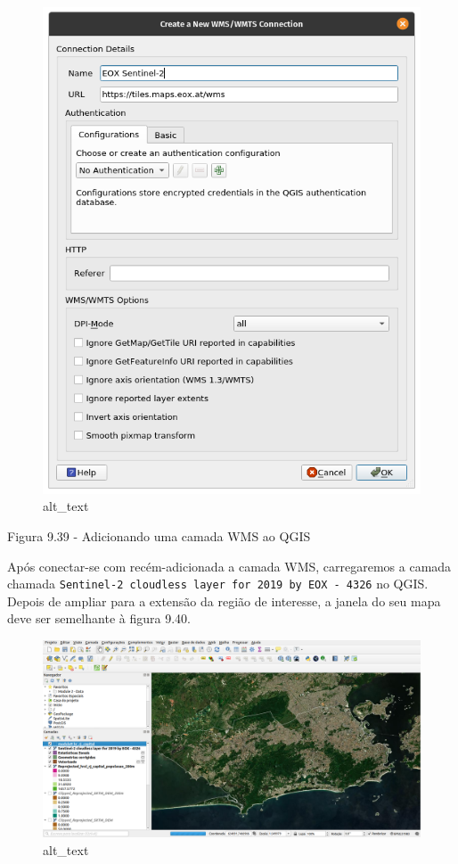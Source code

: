 \documentclass[
]{book}
\begin{document}
\begin{figure}
\centering
\includegraphics{media/modulo9/fig939.png}
\caption{alt\_text}
\end{figure}

Figura 9.39 - Adicionando uma camada WMS ao QGIS

Após conectar-se com recém-adicionada a camada WMS, carregaremos a camada chamada \texttt{Sentinel-2\ cloudless\ layer\ for\ 2019\ by\ EOX\ -\ 4326} no QGIS. Depois de ampliar para a extensão da região de interesse, a janela do seu mapa deve ser semelhante à figura 9.40.

\begin{figure}
\centering
\includegraphics{media/modulo9/fig940.png}
\caption{alt\_text}
\end{figure}
\end{document}
